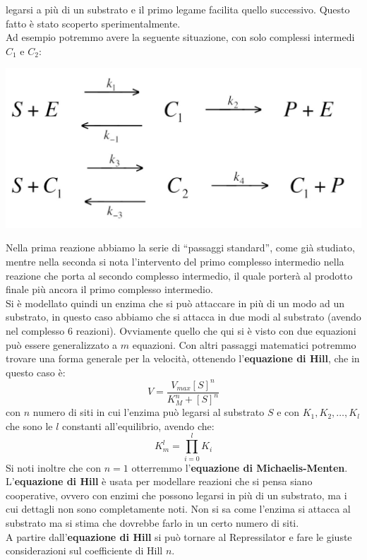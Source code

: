 \documentclass[a4paper,12pt, oneside]{book}
\begin{document}
legarsi a più di un substrato e il primo legame facilita quello
successivo. Questo fatto è stato scoperto sperimentalmente. \\
Ad esempio potremmo avere la seguente situazione, con solo complessi
intermedi $C_1$ e $C_2$: 
\begin{center}
  \includegraphics[scale = 0.12]{img/equ4.jpg}
\end{center}
Nella prima reazione  abbiamo la serie di ``passaggi standard'', come già
studiato, mentre nella seconda 
si nota l'intervento del primo complesso intermedio nella reazione che porta al
secondo complesso intermedio, il quale porterà al prodotto finale più ancora il
primo complesso intermedio.\\
Si è modellato quindi un enzima che si può attaccare in più di un modo ad un
substrato, in questo caso abbiamo che si attacca in due modi al substrato
(avendo nel complesso 6 reazioni). 
Ovviamente quello che qui si è visto con due equazioni può essere generalizzato
a $m$ equazioni.
Con altri passaggi matematici potremmo trovare una forma generale per la
velocità, ottenendo l'\textbf{equazione di Hill}, che in questo caso è:
\[V= \frac{V_{max}[S]^n}{K_M^n+[S]^n}\]
con $n$ numero di siti in cui l'enzima può legarsi al substrato $S$ e con $K_1,
K_2, \ldots, K_l$ che sono le $l$ constanti all'equilibrio, avendo che:
\[K_m^l=\prod_{i=0}^lK_i\]
Si noti inoltre che con $n=1$ otterremmo l'\textbf{equazione di
  Michaelis-Menten}.\\ 
L'\textbf{equazione di Hill} è usata per modellare reazioni che si pensa
siano cooperative, ovvero con enzimi che possono legarsi in più di un substrato,
ma i cui dettagli non sono completamente noti. Non si sa come l'enzima si
attacca al substrato ma si stima che dovrebbe farlo in un certo numero di
siti.\\  
A partire dall'\textbf{equazione di Hill} si può tornare al Repressilator e fare
le giuste considerazioni sul coefficiente di Hill $n$.\\
\end{document}
